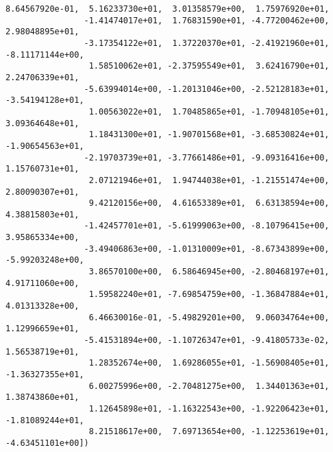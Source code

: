 \documentclass[11pt]{article}
\begin{document}
\begin{Verbatim}[commandchars=\\\{\}]
                 8.64567920e-01,  5.16233730e+01,  3.01358579e+00,  1.75976920e+01,
                -1.41474017e+01,  1.76831590e+01, -4.77200462e+00,  2.98048895e+01,
                -3.17354122e+01,  1.37220370e+01, -2.41921960e+01, -8.11171144e+00,
                 1.58510062e+01, -2.37595549e+01,  3.62416790e+01,  2.24706339e+01,
                -5.63994014e+00, -1.20131046e+00, -2.52128183e+01, -3.54194128e+01,
                 1.00563022e+01,  1.70485865e+01, -1.70948105e+01,  3.09364648e+01,
                 1.18431300e+01, -1.90701568e+01, -3.68530824e+01, -1.90654563e+01,
                -2.19703739e+01, -3.77661486e+01, -9.09316416e+00,  1.15760731e+01,
                 2.07121946e+01,  1.94744038e+01, -1.21551474e+00,  2.80090307e+01,
                 9.42120156e+00,  4.61653389e+01,  6.63138594e+00,  4.38815803e+01,
                -1.42457701e+01, -5.61999063e+00, -8.10796415e+00,  3.95865334e+00,
                -3.49406863e+00, -1.01310009e+01, -8.67343899e+00, -5.99203248e+00,
                 3.86570100e+00,  6.58646945e+00, -2.80468197e+01,  4.91711060e+00,
                 1.59582240e+01, -7.69854759e+00, -1.36847884e+01,  4.01313328e+00,
                 6.46630016e-01, -5.49829201e+00,  9.06034764e+00,  1.12996659e+01,
                -5.41531894e+00, -1.10726347e+01, -9.41805733e-02,  1.56538719e+01,
                 1.28352674e+00,  1.69286055e+01, -1.56908405e+01, -1.36327355e+01,
                 6.00275996e+00, -2.70481275e+00,  1.34401363e+01,  1.38743860e+01,
                 1.12645898e+01, -1.16322543e+00, -1.92206423e+01, -1.81089244e+01,
                 8.21518617e+00,  7.69713654e+00, -1.12253619e+01, -4.63451101e+00])
\end{Verbatim}
            
\end{document}
